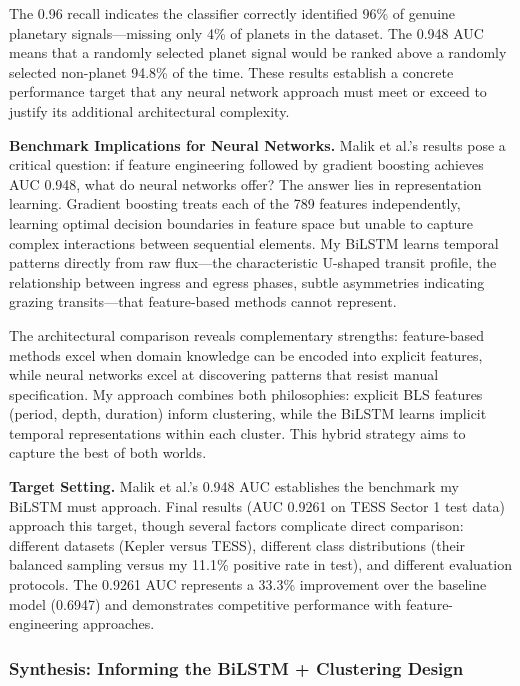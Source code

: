 \documentclass[letterpaper]{article} %
\begin{document}
The 0.96 recall indicates the classifier correctly identified 96\% of genuine planetary signals---missing only 4\% of planets in the dataset. The 0.948 AUC means that a randomly selected planet signal would be ranked above a randomly selected non-planet 94.8\% of the time. These results establish a concrete performance target that any neural network approach must meet or exceed to justify its additional architectural complexity.

\textbf{Benchmark Implications for Neural Networks.} Malik et al.'s results pose a critical question: if feature engineering followed by gradient boosting achieves AUC 0.948, what do neural networks offer? The answer lies in representation learning. Gradient boosting treats each of the 789 features independently, learning optimal decision boundaries in feature space but unable to capture complex interactions between sequential elements. My BiLSTM learns temporal patterns directly from raw flux---the characteristic U-shaped transit profile, the relationship between ingress and egress phases, subtle asymmetries indicating grazing transits---that feature-based methods cannot represent.

The architectural comparison reveals complementary strengths: feature-based methods excel when domain knowledge can be encoded into explicit features, while neural networks excel at discovering patterns that resist manual specification. My approach combines both philosophies: explicit BLS features (period, depth, duration) inform clustering, while the BiLSTM learns implicit temporal representations within each cluster. This hybrid strategy aims to capture the best of both worlds.

\textbf{Target Setting.} Malik et al.'s 0.948 AUC establishes the benchmark my BiLSTM must approach. Final results (AUC 0.9261 on TESS Sector 1 test data) approach this target, though several factors complicate direct comparison: different datasets (Kepler versus TESS), different class distributions (their balanced sampling versus my 11.1\% positive rate in test), and different evaluation protocols. The 0.9261 AUC represents a 33.3\% improvement over the baseline model (0.6947) and demonstrates competitive performance with feature-engineering approaches.

\subsubsection{Synthesis: Informing the BiLSTM + Clustering Design}
\end{document}
